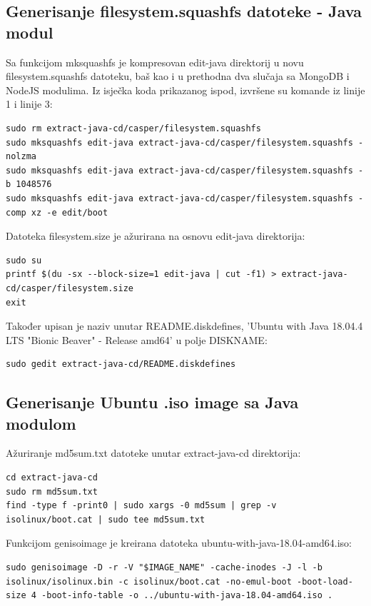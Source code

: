 \documentclass[12pt,vi]{mitthesis}
\begin{document}
\subsection*{Generisanje filesystem.squashfs datoteke - Java modul}
\noindent
Sa funkcijom mksquashfs je kompresovan edit-java direktorij u novu filesystem.squashfs datoteku, baš kao i u prethodna dva slučaja sa MongoDB i NodeJS modulima. Iz isječka koda prikazanog ispod, izvršene su komande iz linije 1 i linije 3:
\begin{lstlisting}[style=BashInputStyle]
sudo rm extract-java-cd/casper/filesystem.squashfs
sudo mksquashfs edit-java extract-java-cd/casper/filesystem.squashfs -nolzma 
sudo mksquashfs edit-java extract-java-cd/casper/filesystem.squashfs -b 1048576
sudo mksquashfs edit-java extract-java-cd/casper/filesystem.squashfs -comp xz -e edit/boot
\end{lstlisting}

\noindent
Datoteka filesystem.size je ažurirana na osnovu edit-java direktorija:
\begin{lstlisting}[style=BashInputStyle]
sudo su
printf $(du -sx --block-size=1 edit-java | cut -f1) > extract-java-cd/casper/filesystem.size
exit
\end{lstlisting}

\noindent
Također upisan je naziv unutar README.diskdefines, 'Ubuntu with Java 18.04.4 LTS "Bionic Beaver" - Release amd64' u polje DISKNAME:
\begin{lstlisting}[style=BashInputStyle]
sudo gedit extract-java-cd/README.diskdefines
\end{lstlisting}

\subsection*{Generisanje Ubuntu .iso image sa Java modulom}
\noindent
Ažuriranje md5sum.txt datoteke unutar extract-java-cd direktorija:
\begin{lstlisting}[style=BashInputStyle]
cd extract-java-cd
sudo rm md5sum.txt
find -type f -print0 | sudo xargs -0 md5sum | grep -v isolinux/boot.cat | sudo tee md5sum.txt
\end{lstlisting}

\noindent
Funkcijom genisoimage je kreirana datoteka ubuntu-with-java-18.04-amd64.iso:
\begin{lstlisting}[style=BashInputStyle]
sudo genisoimage -D -r -V "$IMAGE_NAME" -cache-inodes -J -l -b isolinux/isolinux.bin -c isolinux/boot.cat -no-emul-boot -boot-load-size 4 -boot-info-table -o ../ubuntu-with-java-18.04-amd64.iso .
\end{lstlisting}
\end{document}
